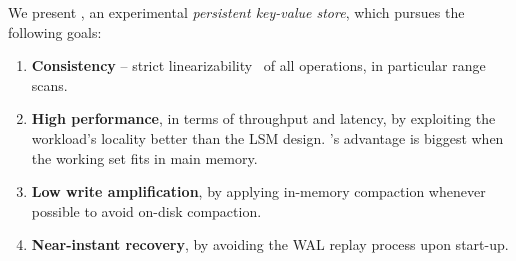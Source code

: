 



We present \sys, an experimental {\em persistent key-value store}, which pursues the following goals: 
\begin{enumerate}

\item{\bf Consistency} -- strict linearizability~\cite{Herlihy} of all operations, in particular range scans. 

\item {\bf High performance}, in terms of throughput and latency, by exploiting the workload's  
locality better than the LSM design. \sys's advantage is biggest when the working set fits in main memory. 

\item {\bf Low write amplification}, by applying in-memory compaction whenever possible to avoid 
on-disk compaction. 

\item {\bf Near-instant recovery}, by avoiding the WAL replay process upon start-up. 
\end{enumerate}


